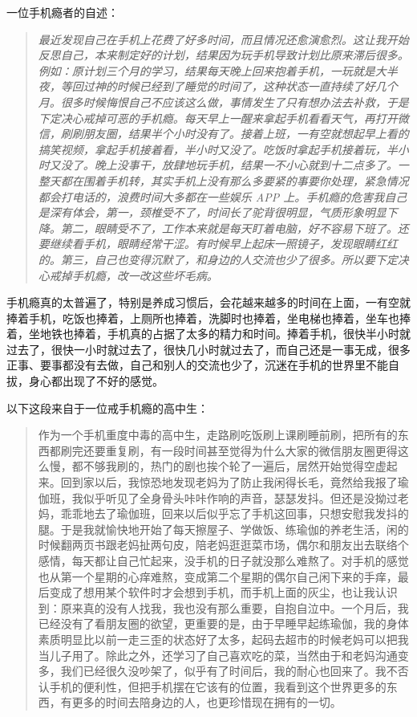 一位手机瘾者的自述：

\begin{quote}\it
    最近发现自己在手机上花费了好多时间，而且情况还愈演愈烈。这让我开始反思自己，本来制定好的计划，结果因为玩手机导致计划比原来滞后很多。例如：原计划三个月的学习，结果每天晚上回来抱着手机，一玩就是大半夜，等回过神的时候已经到了睡觉的时间了，这种状态一直持续了好几个月。很多时候悔恨自己不应该这么做，事情发生了只有想办法去补救，于是下定决心戒掉可恶的手机瘾。每天早上一醒来拿起手机看看天气，再打开微信，刷刷朋友圈，结果半个小时没有了。接着上班，一有空就想起早上看的搞笑视频，拿起手机接着看，半小时又没了。吃饭时拿起手机接着玩，半小时又没了。晚上没事干，放肆地玩手机，结果一不小心就到十二点多了。一整天都在围着手机转，其实手机上没有那么多要紧的事要你处理，紧急情况都会打电话的，浪费时间大多都在一些娱乐 APP 上。手机瘾的危害我自己是深有体会，第一，颈椎受不了，时间长了驼背很明显，气质形象明显下降。第二，眼睛受不了，工作本来就是每天盯着电脑，好不容易下班了。还要继续看手机，眼睛经常干涩。有时候早上起床一照镜子，发现眼睛红红的。第三，自己也变得沉默了，和身边的人交流也少了很多。所以要下定决心戒掉手机瘾，改一改这些坏毛病。
\end{quote}

手机瘾真的太普遍了，特别是养成习惯后，会花越来越多的时间在上面，一有空就捧着手机，吃饭也捧着，上厕所也捧着，洗脚时也捧着，坐电梯也捧着，坐车也捧着，坐地铁也捧着，手机真的占据了太多的精力和时间。捧着手机，很快半小时就过去了，很快一小时就过去了，很快几小时就过去了，而自己还是一事无成，很多正事、要事都没有去做，自己和别人的交流也少了，沉迷在手机的世界里不能自拔，身心都出现了不好的感觉。

以下这段来自于一位戒手机瘾的高中生：

\begin{quote}
    作为一个手机重度中毒的高中生，走路刷吃饭刷上课刷睡前刷，把所有的东西都刷完还要重复刷，有一段时间甚至觉得为什么大家的微信朋友圈更得这么慢，都不够我刷的，热门的剧也挨个轮了一遍后，居然开始觉得空虚起来。回到家以后，我惊恐地发现老妈为了防止我闲得长毛，竟然给我报了瑜伽班，我似乎听见了全身骨头咔咔作响的声音，瑟瑟发抖。但还是没拗过老妈，乖乖地去了瑜伽班，回来以后似乎忘了手机这回事，只想安慰我发抖的腿。于是我就愉快地开始了每天擦屋子、学做饭、练瑜伽的养老生活，闲的时候翻两页书跟老妈扯两句皮，陪老妈逛逛菜市场，偶尔和朋友出去联络个感情，每天都让自己忙起来，没手机的日子就没那么难熬了。对手机的感觉也从第一个星期的心痒难熬，变成第二个星期的偶尔自己闲下来的手痒，最后变成了想用某个软件时才会想到手机，而手机上面的灰尘，也让我认识到：原来真的没有人找我，我也没有那么重要，自抱自泣中。一个月后，我已经没有了看朋友圈的欲望，更重要的是，由于早睡早起练瑜伽，我的身体素质明显比以前一走三歪的状态好了太多，起码去超市的时候老妈可以把我当儿子用了。除此之外，还学习了自己喜欢吃的菜，当然由于和老妈沟通变多，我们已经很久没吵架了，似乎有了时间后，我的耐心也回来了。我不否认手机的便利性，但把手机摆在它该有的位置，我看到这个世界更多的东西，有更多的时间去陪身边的人，也更珍惜现在拥有的一切。
\end{quote}

